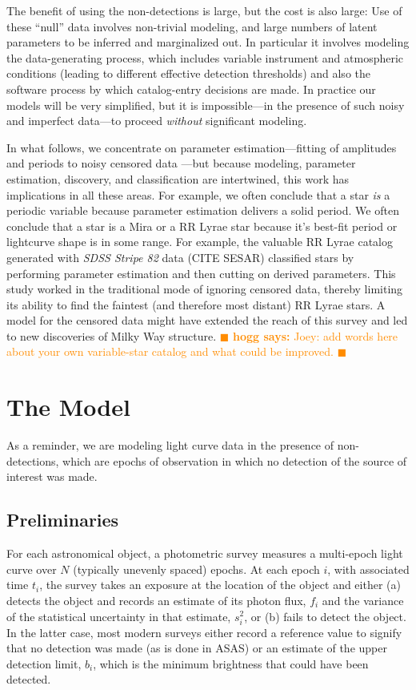 \documentclass[12pt,preprint]{aastex}
\newcommand{\fobs}{f_i}
\newcommand{\sobs}{s^2_i}
\newcommand{\hogg}[1] { \textcolor{darkorange} {
\ensuremath{\blacksquare} {\bf hogg says:}  {#1}
\ensuremath{\blacksquare} } }
\begin{document}
The benefit of using the non-detections is large, but the cost is also large:
Use of these ``null'' data involves non-trivial modeling,
and large numbers of latent parameters to be inferred and marginalized out.
In particular it involves modeling the data-generating process,
which includes variable instrument and atmospheric conditions
(leading to different effective detection thresholds)
and also the software process by which catalog-entry decisions are made.
In practice our models will be very simplified, but it is impossible---in the presence of such noisy and imperfect data---to proceed \emph{without} significant modeling.

In what follows, we concentrate on parameter estimation---fitting of amplitudes and periods to noisy censored data%
---but because modeling, parameter estimation, discovery, and classification are intertwined,
this work has implications in all these areas.
For example, we often conclude that a star \emph{is} a periodic variable because parameter estimation delivers a solid period.
We often conclude that a star is a Mira or a RR Lyrae star because it's best-fit period or lightcurve shape is in some range.
For example, the valuable RR Lyrae catalog generated with \textsl{SDSS Stripe 82} data (CITE SESAR) classified stars
by performing parameter estimation and then cutting on derived parameters.
This study worked in the traditional mode of ignoring censored data, thereby limiting its ability to find the faintest
(and therefore most distant) RR Lyrae stars.
A model for the censored data might have extended the reach of this survey and led to new discoveries of Milky Way structure.
\hogg{Joey: add words here about your own variable-star catalog and what could be improved.}

\section{The Model}
\label{sec:model}

As a reminder, we are modeling light curve data in the presence of non-detections, which are epochs of observation in which no detection of the source of interest was made.

\subsection{Preliminaries}
\label{ss:prelim}

For each astronomical object, a photometric survey measures a multi-epoch light curve over $N$ (typically unevenly spaced) epochs.  At each epoch $i$, with associated time $t_i$, the survey takes an exposure at the location of the object and either (a) detects the object and records an estimate of its photon flux, $\fobs$ and the  variance of the statistical uncertainty in that estimate, $\sobs$, or (b) fails to detect the object.  In the latter case, most modern surveys either record a reference value to signify that no detection was made (as is done in ASAS) or an estimate of the upper detection limit, $b_i$, which is the minimum brightness that could have been detected.
\end{document}
